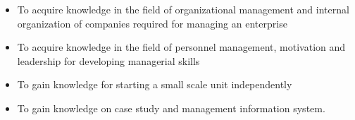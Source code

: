 
\cobjectives
  \begin{itemize}
    \item To acquire knowledge in the field of organizational management and internal organization of companies required for managing an enterprise
    \item To acquire knowledge in the field of personnel management, motivation and leadership for developing managerial skills
    \item To gain knowledge for starting a small scale unit independently
    \item To gain knowledge on case study and management information system.
  \end{itemize}
  \VS


